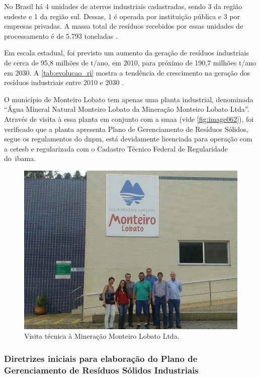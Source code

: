 No Brasil há 4 unidades de aterros industriais cadastradas, sendo 3 da região sudeste e 1 da região sul. Dessas, 1 é operada por instituição pública e 3 por empresas privadas. A massa total de resíduos recebidos por essas unidades de processamento é de 5.793 toneladas \cite{SNIS2016}.

Em escala estadual, foi previsto um aumento da geração de resíduos industriais de cerca de 95,8 milhões de t/ano, em 2010, para próximo de 190,7 milhões t/ano em 2030. A \autoref{tab:evolucao_ri} mostra a tendência de crescimento na geração dos resíduos industriais entre 2010 e 2030 \cite{PERS2014}.



O município de Monteiro Lobato tem apenas uma planta industrial, denominada “Água Mineral Natural Monteiro Lobato da Mineração Monteiro Lobato Ltda”. Através de visita à essa planta em conjunto com a \gls{smaa} (vide \autoref{fig:image062}), foi verificado que a planta apresenta Plano de Gerenciamento de Resíduos Sólidos, segue os regulamentos do \gls{dnpm}, está devidamente licenciada para operação com a \gls{cetesb} e regularizada com o Cadastro Técnico Federal de Regularidade do \gls{ibama}.

\begin{figure}
	\centering
	\includegraphics[width=0.75\linewidth]{produtos/prodtres/image062}
	\caption{Visita técnica à Mineração Monteiro Lobato Ltda.}
	\label{fig:image062}
\end{figure}


\subsubsection{Diretrizes iniciais para elaboração do Plano de Gerenciamento de Resíduos Sólidos Industriais}

